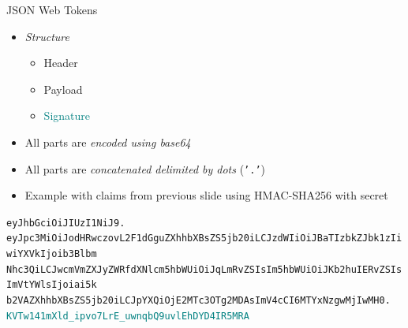 \documentclass[aspectratio=169]{beamer}
\begin{document}
\begin{frame}{JSON Web Tokens}
	\begin{itemize}
		\item \emph{Structure}
		\begin{itemize}
			\item \textcolor<2>{ed-blue}{Header} \hfill {}
			\item \textcolor<2>{ed-pink}{Payload} \hfill {}
			\item \textcolor<2>{teal}{Signature} \hfill {}
		\end{itemize}
		\item All parts are \emph{encoded using base64}
		\item All parts are \emph{concatenated delimited by dots} (\texttt{'.'})
		\pause
		\item Example with claims from previous slide using HMAC-SHA256 with secret 
	\end{itemize}

	\begin{center}
		\footnotesize
		\texttt{\textcolor{ed-blue}{eyJhbGciOiJIUzI1NiJ9}.} \\
		\texttt{\textcolor{ed-pink}{eyJpc3MiOiJodHRwczovL2F1dGguZXhhbXBsZS5jb20iLCJzdWIiOiJBaTIzbkZJbk1zIiwiYXVkIjoib3Blbm\\Nhc3QiLCJwcmVmZXJyZWRfdXNlcm5hbWUiOiJqLmRvZSIsIm5hbWUiOiJKb2huIERvZSIsImVtYWlsIjoiai5k\\b2VAZXhhbXBsZS5jb20iLCJpYXQiOjE2MTc3OTg2MDAsImV4cCI6MTYxNzgwMjIwMH0}.} \\
		\texttt{\textcolor{teal}{KVTw141mXld\_ipvo7LrE\_uwnqbQ9uvlEhDYD4IR5MRA}}
	\end{center}

\end{frame}
\end{document}
